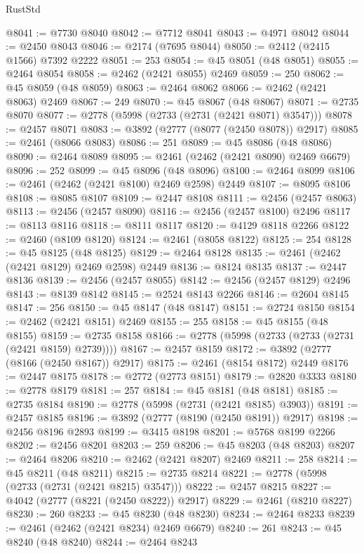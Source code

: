 \begin{lexlean}{RustStd}
\begin{coremodule}
@8041 := @7730 @8040
@8042 := @7712 @8041
@8043 := @4971 @8042
@8044 := @2450 @8043
@8046 := @2174 (@7695 @8044)
@8050 := @2412 (@2415 @1566) @7392 @2222
@8051 := 253
@8054 := @45 @8051 (@48 @8051)
@8055 := @2464 @8054
@8058 := @2462 (@2421 @8055) @2469
@8059 := 250
@8062 := @45 @8059 (@48 @8059)
@8063 := @2464 @8062
@8066 := @2462 (@2421 @8063) @2469
@8067 := 249
@8070 := @45 @8067 (@48 @8067)
@8071 := @2735 @8070
@8077 := @2778 (@5998 (@2733 (@2731 (@2421 @8071) @3547)))
@8078 := @2457 @8071
@8083 := @3892 (@2777 (@8077 (@2450 @8078)) @2917)
@8085 := @2461 (@8066 @8083)
@8086 := 251
@8089 := @45 @8086 (@48 @8086)
@8090 := @2464 @8089
@8095 := @2461 (@2462 (@2421 @8090) @2469 @6679)
@8096 := 252
@8099 := @45 @8096 (@48 @8096)
@8100 := @2464 @8099
@8106 := @2461 (@2462 (@2421 @8100) @2469 @2598) @2449
@8107 := @8095 @8106
@8108 := @8085 @8107
@8109 := @2447 @8108
@8111 := @2456 (@2457 @8063)
@8113 := @2456 (@2457 @8090)
@8116 := @2456 (@2457 @8100) @2496
@8117 := @8113 @8116
@8118 := @8111 @8117
@8120 := @4129 @8118 @2266
@8122 := @2460 (@8109 @8120)
@8124 := @2461 (@8058 @8122)
@8125 := 254
@8128 := @45 @8125 (@48 @8125)
@8129 := @2464 @8128
@8135 := @2461 (@2462 (@2421 @8129) @2469 @2598) @2449
@8136 := @8124 @8135
@8137 := @2447 @8136
@8139 := @2456 (@2457 @8055)
@8142 := @2456 (@2457 @8129) @2496
@8143 := @8139 @8142
@8145 := @2524 @8143 @2266
@8146 := @2604 @8145
@8147 := 256
@8150 := @45 @8147 (@48 @8147)
@8151 := @2724 @8150
@8154 := @2462 (@2421 @8151) @2469
@8155 := 255
@8158 := @45 @8155 (@48 @8155)
@8159 := @2735 @8158
@8166 := @2778 (@5998 (@2733 (@2733 (@2731 (@2421 @8159) @2739))))
@8167 := @2457 @8159
@8172 := @3892 (@2777 (@8166 (@2450 @8167)) @2917)
@8175 := @2461 (@8154 @8172) @2449
@8176 := @2447 @8175
@8178 := @2772 (@2773 @8151)
@8179 := @2820 @3333
@8180 := @2778 @8179
@8181 := 257
@8184 := @45 @8181 (@48 @8181)
@8185 := @2735 @8184
@8190 := @2778 (@5998 (@2731 (@2421 @8185) @3903))
@8191 := @2457 @8185
@8196 := @3892 (@2777 (@8190 (@2450 @8191)) @2917)
@8198 := @2456 @8196 @2893
@8199 := @3415 @8198
@8201 := @5768 @8199 @2266
@8202 := @2456 @8201
@8203 := 259
@8206 := @45 @8203 (@48 @8203)
@8207 := @2464 @8206
@8210 := @2462 (@2421 @8207) @2469
@8211 := 258
@8214 := @45 @8211 (@48 @8211)
@8215 := @2735 @8214
@8221 := @2778 (@5998 (@2733 (@2731 (@2421 @8215) @3547)))
@8222 := @2457 @8215
@8227 := @4042 (@2777 (@8221 (@2450 @8222)) @2917)
@8229 := @2461 (@8210 @8227)
@8230 := 260
@8233 := @45 @8230 (@48 @8230)
@8234 := @2464 @8233
@8239 := @2461 (@2462 (@2421 @8234) @2469 @6679)
@8240 := 261
@8243 := @45 @8240 (@48 @8240)
@8244 := @2464 @8243

\end{coremodule}
\end{lexlean}
